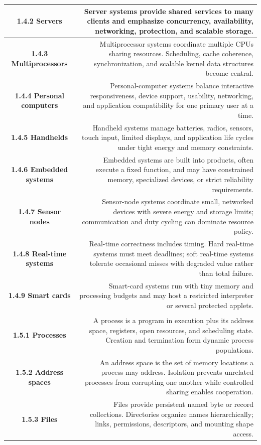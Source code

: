 \documentclass[10pt,letterpaper]{article}
\begin{document}
\begin{longtable}{C N}
\textbf{1.4.2 Servers} & Server systems provide shared services to many clients and emphasize concurrency, availability, networking, protection, and scalable storage.\\\hline
\textbf{1.4.3 Multiprocessors} & Multiprocessor systems coordinate multiple CPUs sharing resources. Scheduling, cache coherence, synchronization, and scalable kernel data structures become central.\\\hline
\textbf{1.4.4 Personal computers} & Personal-computer systems balance interactive responsiveness, device support, usability, networking, and application compatibility for one primary user at a time.\\\hline
\textbf{1.4.5 Handhelds} & Handheld systems manage batteries, radios, sensors, touch input, limited displays, and application life cycles under tight energy and memory constraints.\\\hline
\textbf{1.4.6 Embedded systems} & Embedded systems are built into products, often execute a fixed function, and may have constrained memory, specialized devices, or strict reliability requirements.\\\hline
\textbf{1.4.7 Sensor nodes} & Sensor-node systems coordinate small, networked devices with severe energy and storage limits; communication and duty cycling can dominate resource policy.\\\hline
\textbf{1.4.8 Real-time systems} & Real-time correctness includes timing. Hard real-time systems must meet deadlines; soft real-time systems tolerate occasional misses with degraded value rather than total failure.\\\hline
\textbf{1.4.9 Smart cards} & Smart-card systems run with tiny memory and processing budgets and may host a restricted interpreter or several protected applets.\\\hline
{}\\*\hline
\textbf{1.5.1 Processes} & A process is a program in execution plus its address space, registers, open resources, and scheduling state. Creation and termination form dynamic process populations.\\\hline
\textbf{1.5.2 Address spaces} & An address space is the set of memory locations a process may address. Isolation prevents unrelated processes from corrupting one another while controlled sharing enables cooperation.\\\hline
\textbf{1.5.3 Files} & Files provide persistent named byte or record collections. Directories organize names hierarchically; links, permissions, descriptors, and mounting shape access.\\\hline

\end{longtable}
\end{document}
